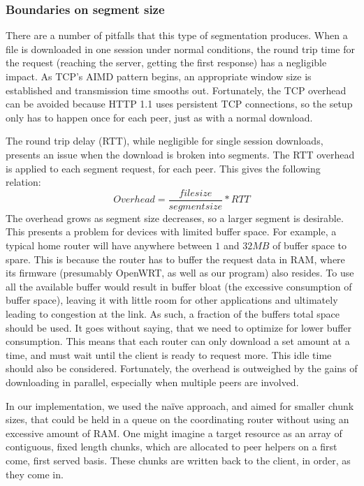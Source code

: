 \documentclass[12pt]{article}
\begin{document}
		\subsubsection{Boundaries on segment size}

			There are a number of pitfalls that this type of segmentation produces. When a file is downloaded in one session under normal conditions, the round trip time for the request (reaching the server, getting the first response) has a negligible impact. As TCP's AIMD pattern begins, an appropriate window size is established and transmission time smooths out. Fortunately, the TCP overhead can be avoided because HTTP 1.1 uses persistent TCP connections, so the setup only has to happen once for each peer, just as with a normal download.

			The round trip delay (RTT), while negligible for single session downloads, presents an issue when the download is broken into segments. The RTT overhead is applied to each segment request, for each peer. This gives the following relation:
			$$Overhead = \frac{file size}{segment size} * RTT$$
			The overhead grows as segment size decreases, so a larger segment is desirable. This presents a problem for devices with limited buffer space. For example, a typical home router will have anywhere between $1$ and $32MB$ of buffer space to spare. This is because the router has to buffer the request data in RAM, where its firmware (presumably OpenWRT, as well as our program) also resides. To use all the available buffer would result in buffer bloat (the excessive consumption of buffer space), leaving it with little room for other applications and ultimately leading to congestion at the link. As such, a fraction of the buffers total space should be used. It goes without saying, that we need to optimize for lower buffer consumption. This means that each router can only download a set amount at a time, and must wait until the client is ready to request more. This idle time should also be considered. Fortunately, the overhead is outweighed by the gains of downloading in parallel, especially when multiple peers are involved.

			In our implementation, we used the na\"{i}ve approach, and aimed for smaller chunk sizes, that could be held in a queue on the coordinating router without using an excessive amount of RAM. One might imagine a target resource as an array of contiguous, fixed length chunks, which are allocated to peer helpers on a first come, first served basis. These chunks are written back to the client, in order, as they come in.
\end{document}
